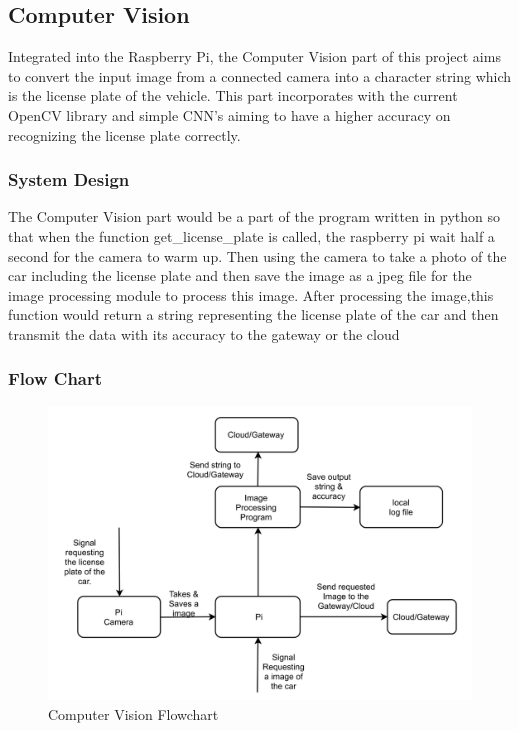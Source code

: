 \documentclass[paper=a4, fontsize=12pt]{scrartcl}
\numberwithin{equation}{section}		%
\numberwithin{figure}{section}			%
\numberwithin{table}{section}				%
\begin{document}
\subsection{Computer Vision}
Integrated into the Raspberry Pi, the Computer Vision part of this project aims to convert the input image from a connected camera into a character string which is the license plate of the vehicle. This part incorporates with the current OpenCV library and simple CNN's aiming to have a higher accuracy on recognizing the license plate correctly.

\subsubsection{System Design}
The Computer Vision part would be a part of the program written in python so that when the function get\_license\_plate is called, the raspberry pi wait half a second for the camera to warm up. Then using the camera to take a photo of the car including the license plate and then save the image as a jpeg file for the image processing  module to process this image. After processing the image,this function would return a string representing the license plate of the car and then transmit the data with its accuracy to the gateway or the cloud
\subsubsection{Flow Chart}

\begin{figure}[H]
\centering
\includegraphics[width=6in]{CV.png}
\caption{Computer Vision Flowchart}
\end{figure}
\end{document}
